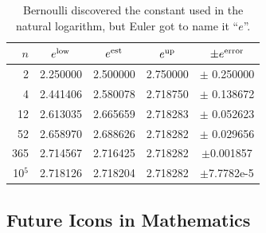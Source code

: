 \begin{table}[htb]
\centering
\begin{tabular}{|r|c|c|c|c|}
\hline
$n$ & $e^{\rm low}$ & $e^{\rm est}$ & $e^{\rm up}$ & $\pm e^{\rm error}$ \\
\hline
\hline
2 &  2.250000& 2.500000 & 2.750000& $\pm$ 0.250000 \\ \hline 
4&  2.441406 & 2.580078 & 2.718750& $\pm$ 0.138672 \\ \hline
12&  2.613035 & 2.665659 & 2.718283& $\pm$ 0.052623 \\ \hline
52&  2.658970& 2.688626 & 2.718282 & $\pm$ 0.029656\\ \hline
365&  2.714567 & 2.716425 & 2.718282& $\pm$0.001857 \\  \hline
10$^5$ &  2.718126 & 2.718204 & 2.718282 & $\pm$7.7782e-5 \\ 
\hline
\end{tabular}
\caption{Bernoulli discovered the constant used in the natural logarithm, but Euler got to name it ``$e$''.}
\label{table:BernoulliAndCompoundInterest}
\end{table}








\subsection{Future Icons in Mathematics}

